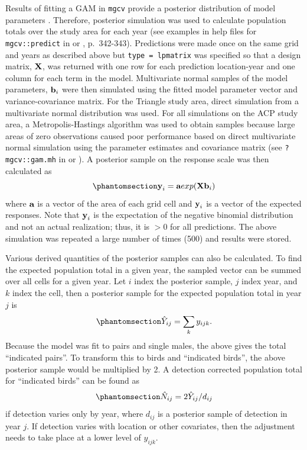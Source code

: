 \documentclass[
  10pt,
  letterpaper,
]{article}
\begin{document}
Results of fitting a GAM in \texttt{mgcv} provide a posterior
distribution of model parameters \citep{wood2017, miller2025bayesian}. Therefore, posterior simulation was used to calculate population totals over the study area for each year (see examples in help files for \texttt{mgcv::predict} in \citep{r-mgcv} or \citep{wood2017}, p.~342-343). Predictions were made once on the same grid and years as described above but \texttt{type\ =\ lpmatrix} was specified so that a design matrix, \(\textbf X\), was returned with one row for each prediction location-year and one column for each term in the model. Multivariate normal samples of the model parameters, \(\textbf b_i\) were then simulated using the fitted model parameter vector and variance-covariance matrix. For the Triangle study area, direct simulation from a multivariate normal distribution was used. For all simulations on the ACP study area, a Metropolis-Hastings algorithm was used to obtain samples because large areas of zero observations caused poor performance based on direct multivariate normal simulation using the parameter estimates and covariance matrix (see
\texttt{?mgcv::gam.mh} in \citep{r-mgcv} or \citep{gratiaPost}). A
posterior sample on the response scale was then calculated as
\begin{equation}\phantomsection\label{eq-3}{\textbf y_i = \textbf a exp(\textbf X \textbf b_i )}\end{equation}
where \(\textbf a\) is a vector of the area of each grid cell and
\(\textbf y_i\) is a vector of the expected responses. Note that
\(\textbf y_i\) is the expectation of the negative binomial distribution
and not an actual realization; thus, it is \(>0\) for all predictions.
The above simulation was repeated a large number of times (500) and
results were stored.

Various derived quantities of the posterior samples can also be
calculated. To find the expected population total in a given year, the
sampled vector can be summed over all cells for a given year. Let \(i\)
index the posterior sample, \(j\) index year, and \(k\) index the cell,
then a posterior sample for the expected population total in year \(j\)
is
\begin{equation}\phantomsection\label{eq-4}{\hat Y_{ij} = \sum_k y_{ijk}.}\end{equation}
Because the model was fit to pairs and single males, the above gives the
total ``indicated pairs''. To transform this to birds and ``indicated
birds'', the above posterior sample would be multiplied by 2. A
detection corrected population total for ``indicated birds'' can be
found as
\begin{equation}\phantomsection\label{eq-5}{\hat N_{ij} = 2 \hat Y _{ij}/d_{ij}}\end{equation}
if detection varies only by year, where \(d_{ij}\) is a posterior sample
of detection in year \(j\). If detection varies with location or other
covariates, then the adjustment needs to take place at a lower level of
\(y_{ijk}\).
\end{document}
